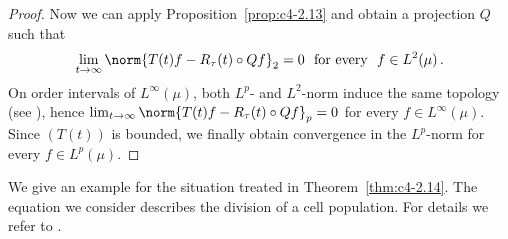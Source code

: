 \begin{proof}
Now we can apply Proposition~\ref{prop:c4-2.13} and obtain a projection $Q$ such that 
\[ 
\lim_{t \to \infty}\norm{T(t)f - R_{\tau}(t) \circ Qf}_{2} = 0 \ \text{ for every 
} \ f \in L^{2}(\mu)\,.
\]
On order intervals of\/ $L^{\infty}(\mu)$, both $L^{p}$- and $L^{2}$-norm induce the same topology (see \textcite[V.8.3]{schaefer:1974}), 
hence $\lim_{t \to \infty} \norm{T(t)f - R_{\tau}(t) \circ Qf}_{p} = 0$ for every $f \in L^{\infty}(\mu)$.
Since $(T(t))$ is bounded, we finally obtain convergence in the $L^{p}$-norm for every $f \in L^{p}(\mu)$.
\end{proof}
%
We give an example for the situation treated in Theorem~\ref{thm:c4-2.14}.
The equation we consider describes the division of a cell population.
For details we refer to \textcite{diekmannetal:1984}.


